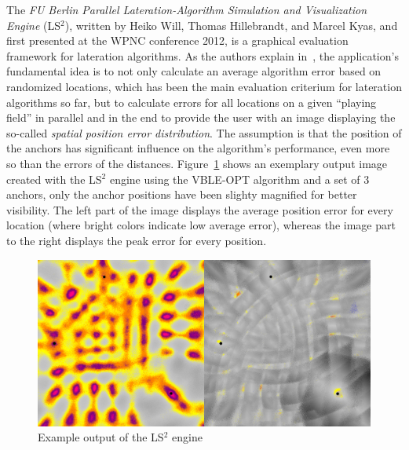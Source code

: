 The \emph{FU Berlin Parallel Lateration-Algorithm Simulation and Visualization Engine} (LS$^{2}$), written by Heiko Will, Thomas Hillebrandt, and Marcel Kyas, and first presented at the WPNC conference 2012, is a graphical evaluation framework for lateration algorithms. As the authors explain in~\cite{will2012ls2}, the application's fundamental idea is to not only calculate an average algorithm error based on randomized locations, which has been the main evaluation criterium for lateration algorithms so far, but to calculate errors for all locations on a given ``playing field'' in parallel and in the end to provide the user with an image displaying the so-called \emph{spatial position error distribution}. The assumption is that the position of the anchors has significant influence on the algorithm's performance, even more so than the errors of the distances. Figure~\ref{fig:lateration} shows an exemplary output image created with the LS$^{2}$ engine using the VBLE-OPT algorithm and a set of 3 anchors, only the anchor positions have been slighty magnified for better visibility. The left part of the image displays the average position error for every location (where bright colors indicate low average error), whereas the image part to the right displays the peak error for every position.

\begin{figure}[ht]
\begin{center}
\includegraphics[width=14cm]{img/lateration}
\end{center}
\caption{Example output of the LS$^{2}$ engine}
\label{fig:lateration}
\end{figure}

